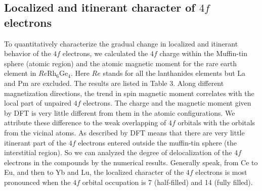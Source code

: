\documentclass[preprint,12pt]{elsarticle}
\begin{document}
\subsection{Localized and itinerant character of $4f$ electrons}

To quantitatively characterize the gradual change in localized and itinerant behavior of the $4f$ electrons, we calculated the $4f$ charge within the Muffin-tin sphere (atomic region) and the atomic magnetic moment for the rare earth element in $Re$Rh$_6$Ge$_4$. Here $Re$ stands for all the lanthanides elements but La and Pm are excluded. The results are listed in Table 3. Along different magnetization directions, the trend in spin magnetic moment correlates with the local part of unpaired $4f$ electrons. The charge and the magnetic moment given by DFT is very little different from them in the atomic configurations. We attribute these difference to the weak overlapping of $4f$ orbitals with the orbitals from the vicinal atoms. As described by DFT means that there are very little itinerant part of the $4f$ electrons entered outside the muffin-tin sphere (the interstitial region). So we can analyzed the degree of delocalization of the $4f$ electrons in the compounds by the numerical results. Generally speak, from Ce to Eu, and then to Yb and Lu, the localized character of the $4f$ electrons is most pronounced when the $4f$ orbital occupation is 7 (half-filled) and 14 (fully filled).
\end{document}
